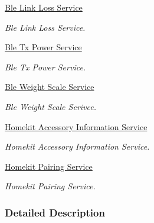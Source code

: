 \begin{DoxyCompactItemize}
\hyperlink{group___b_l_e___l_l_s}{Ble Link Loss Service}
\begin{DoxyCompactList}\small\item\em Ble Link Loss Service. \end{DoxyCompactList}\item 
\hyperlink{group___b_l_e___t_p_s}{Ble Tx Power Service}
\begin{DoxyCompactList}\small\item\em Ble Tx Power Service. \end{DoxyCompactList}\item 
\hyperlink{group___b_l_e___w_s_s}{Ble Weight Scale Service}
\begin{DoxyCompactList}\small\item\em Ble Weight Scale Serivce. \end{DoxyCompactList}\item 
\hyperlink{group___h_a_i_s}{Homekit Accessory Information Service}
\begin{DoxyCompactList}\small\item\em Homekit Accessory Information Service. \end{DoxyCompactList}\item 
\hyperlink{group___h_p_s}{Homekit Pairing Service}
\begin{DoxyCompactList}\small\item\em Homekit Pairing Service. \end{DoxyCompactList}\end{DoxyCompactItemize}


\subsubsection{Detailed Description}
